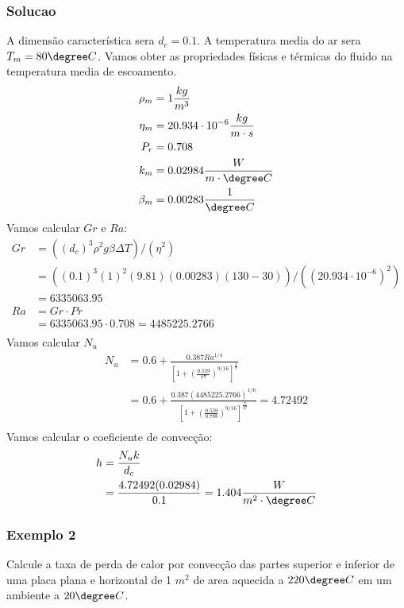 \subsubsection{Solucao}
A dimensão característica sera \(d_{c} = 0.1\). A temperatura media do ar sera \(T_{m} = 80\degree C\).
Vamos obter as propriedades físicas e térmicas do fluido na temperatura media de escoamento.
\begin{align}
    \rho _{m} &= 1 \frac{kg}{m^{3} }\\
    \eta _{m} &= 20.934 \cdot 10^{-6}  \frac{kg}{m \cdot s}\\ 
    P_r &= 0.708\\
    k_{m} &= 0.02984 \frac{W}{m \cdot \degree C}\\
    \beta _{m} &= 0.00283 \frac{1}{\degree C}
\end{align}
Vamos calcular \(Gr\) e \(Ra\):
\begin{align}
    Gr &= ((d_{c} )^{3} \rho ^{2} g \beta \Delta T)/(\eta ^{2} )\\
    &= ((0.1)^{3} (1)^{2} (9.81) (0.00283) (130 - 30))/((20.934 \cdot 10^{-6} )^{2} )\\
    &= 6335063.95\\
    Ra &= Gr \cdot Pr\\
    &= 6335063.95 \cdot 0.708 = 4485225.2766\\
\end{align}
Vamos calcular \(N_{u} \)
\begin{align}
    N_{u} &= 0.6 + \frac{0.387 Ra^{1/4} }{\left[ 1 + \left( \frac{0.559}{Pr} \right)^{9/16}  \right]^{\frac{4}{9}} }\\
    &= 0.6 + \frac{0.387 (4485225.2766)^{1/6} }{\left[ 1 + \left( \frac{0.559}{0.708} \right)^{9/16}  \right]^{\frac{8}{27}} } = 4.72492\\
\end{align}
Vamos calcular o coeficiente de convecção:
\begin{align}
    h &= \frac{N_{u} k}{d_{c} }\\
    &= \frac{4.72492 (0.02984)}{0.1} = 1.404 \frac{W}{m^{2} \cdot \degree C}\\
\end{align}
\subsubsection{Exemplo 2}
Calcule a taxa de perda de calor por convecção das partes superior e inferior de uma placa plana e
horizontal de 1 \(m^{2} \) de area aquecida a \(220 \degree C\) em um ambiente a \(20 \degree C\).
